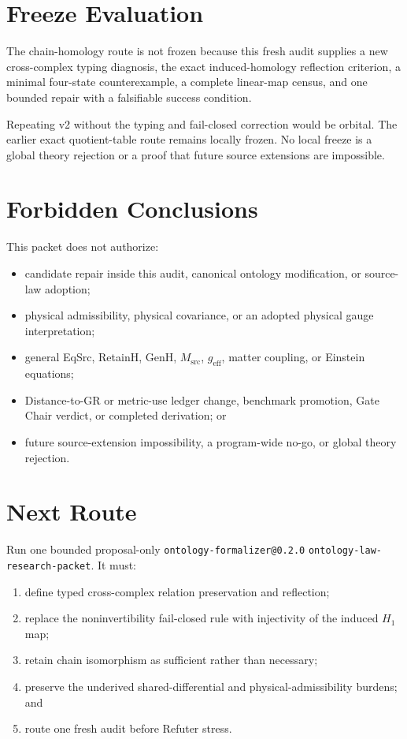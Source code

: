 \documentclass[11pt]{article}
\begin{document}
\section{Freeze Evaluation}

The chain-homology route is not frozen because this fresh audit supplies a new
cross-complex typing diagnosis, the exact induced-homology reflection
criterion, a minimal four-state counterexample, a complete linear-map census,
and one bounded repair with a falsifiable success condition.

Repeating v2 without the typing and fail-closed correction would be orbital.
The earlier exact quotient-table route remains locally frozen. No local freeze
is a global theory rejection or a proof that future source extensions are
impossible.

\section{Forbidden Conclusions}

This packet does not authorize:
\begin{itemize}[leftmargin=*]
  \item candidate repair inside this audit, canonical ontology modification,
  or source-law adoption;
  \item physical admissibility, physical covariance, or an adopted physical
  gauge interpretation;
  \item general EqSrc, RetainH, GenH, \(M_{\mathrm{src}}\),
  \(g_{\mathrm{eff}}\), matter coupling, or Einstein equations;
  \item Distance-to-GR or metric-use ledger change, benchmark promotion,
  Gate Chair verdict, or completed derivation; or
  \item future source-extension impossibility, a program-wide no-go, or global
  theory rejection.
\end{itemize}

\section{Next Route}

Run one bounded proposal-only
\texttt{ontology-formalizer@0.2.0}
\texttt{ontology-law-research-packet}. It must:
\begin{enumerate}[leftmargin=*]
  \item define typed cross-complex relation preservation and reflection;
  \item replace the noninvertibility fail-closed rule with injectivity of the
  induced \(H_1\) map;
  \item retain chain isomorphism as sufficient rather than necessary;
  \item preserve the underived shared-differential and physical-admissibility
  burdens; and
  \item route one fresh audit before Refuter stress.
\end{enumerate}
\end{document}
